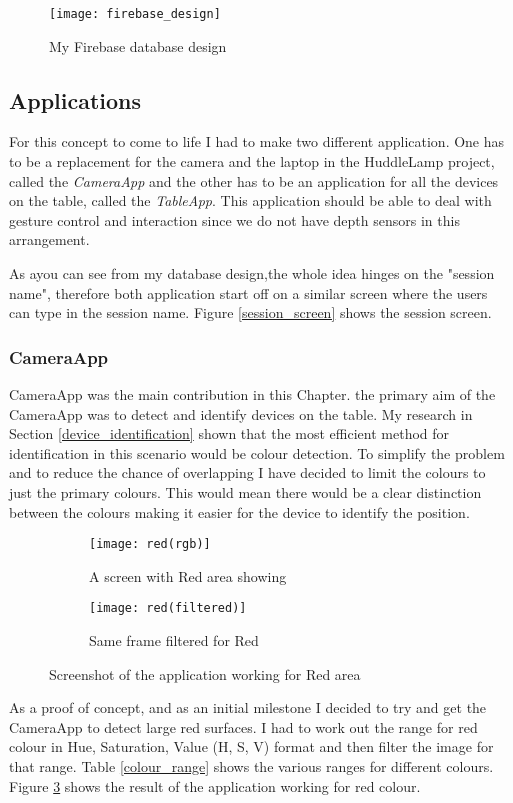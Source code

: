 \begin{figure}
\centering
\texttt{[image: firebase\_design]}
\caption{My Firebase database design}
\label{firebase_design}
\end{figure}


\subsection{Applications}
For this concept to come to life I had to make two different application. One has to be a replacement for the camera and the laptop in the HuddleLamp project, called the \emph{CameraApp} and the other has to be an application for all the devices on the table, called the \emph{TableApp}. This application should be able to deal with gesture control and interaction since we do not have depth sensors in this arrangement.

As ayou can see from my database design,the whole idea hinges on the "session name", therefore both application start off on a similar screen where the users can type in the session name. Figure \ref{session_screen} shows the session screen. 
\subsubsection{CameraApp} \label{cameraapp}
CameraApp was the main contribution in this Chapter. the primary aim of the CameraApp was to detect and identify devices on the table. My research in Section \ref{device_identification} shown that the most efficient method for identification in this scenario would be colour detection. To simplify the problem and to reduce the chance of overlapping I have decided to limit the colours to just the primary colours. This would mean there would be a clear distinction between the colours making it easier for the device to identify the position.
\begin{figure}[H]
    \centering
    \begin{subfigure}[b]{0.47\textwidth}
        \centering
        \texttt{[image: red(rgb)]}
        \caption{A screen with Red area showing}
        \label{red_screen}
    \end{subfigure}
    \hfill
    \begin{subfigure}[b]{0.47\textwidth}
        \centering
        \texttt{[image: red(filtered)]}
        \caption{Same frame filtered for Red}
    \end{subfigure}
    \hfill
    \caption{Screenshot of the application working for Red area}
     \label{filtered_red}
\end{figure}
As a proof of concept, and as an initial milestone I decided to try and get the CameraApp to detect large red surfaces. I had to work out the range for red colour in Hue, Saturation, Value (H, S, V) format and then filter the image for that range. Table \ref{colour_range} shows the various ranges for different colours. Figure \ref{filtered_red} shows the result of the application working for red colour.

